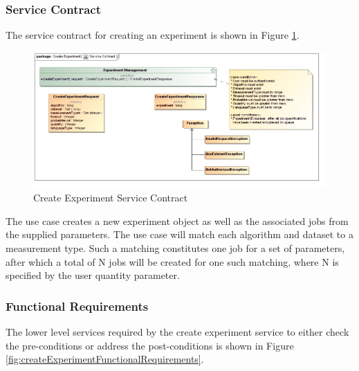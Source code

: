 \subsubsection{Service Contract}
The service contract for creating an experiment is shown in 
Figure \ref{fig:createExperimentServiceContract}.
\begin{figure}[H]
  \begin{center}
  \includegraphics[scale=0.38]{../Diagrams and Charts/Experiment/Create Experiment Service Contract.jpg}
  \caption{Create Experiment Service Contract}
  \label{fig:createExperimentServiceContract}
  \end{center}
\end{figure}

The use case creates a new experiment object as well as the associated jobs from
the supplied parameters. The use case will match each algorithm and dataset to a
measurement type. Such a matching constitutes one job for a set of parameters, 
after which a total of N jobs will be created for one such matching, where N is
specified by the user quantity parameter.

\subsubsection {Functional Requirements}
The lower level services required by the create experiment service to 
either check the pre-conditions or address the post-conditions is shown in
Figure \ref{fig:createExperimentFunctionalRequirements}.

